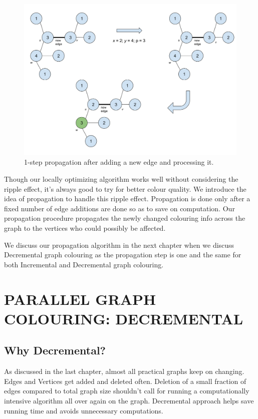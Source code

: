 \documentclass[MTech]{iitmdiss}
\begin{document}
\begin{figure}[h]
    \centering
    \includegraphics[width=\textwidth,keepaspectratio=true]{propagation.jpg}
    \caption{
        1-step propagation after adding a new edge and processing it. 
    }
    \label{fig:propagation}
\end{figure}

Though our locally optimizing algorithm works well without considering the ripple effect, it's always good to try for better colour quality. We introduce the idea of propagation to handle this ripple effect. Propagation is done only after a fixed number of edge additions are done so as to save on computation. Our propagation procedure propagates the newly changed colouring info across the graph to the vertices who could possibly be affected. 

We discuss our propagation algorithm in the next chapter when we discuss Decremental graph colouring as the propagation step is one and the same for both Incremental and Decremental graph colouring.

\chapter{PARALLEL GRAPH COLOURING: DECREMENTAL}
\section{Why Decremental?}
As discussed in the last chapter, almost all practical graphs keep on changing. Edges and Vertices get added and deleted often. Deletion of a small fraction of edges compared to total graph size shouldn't call for running a computationally intensive algorithm all over again on the graph. Decremental approach helps save running time and avoids unnecessary computations.
\end{document}
